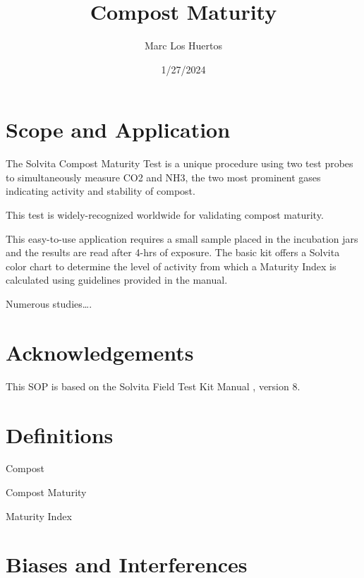 \documentclass[12pt]{../SOP4_alpha}\usepackage[]{graphicx}\usepackage[]{xcolor}
\title{Compost Maturity}
\date{1/27/2024}
\author{Marc Los Huertos}
\begin{document}

\maketitle

\section{Scope and Application}

\NP The Solvita Compost Maturity Test is a unique procedure using two test probes to simultaneously measure CO2 and NH3, the two most prominent gases indicating activity and stability of compost.

\NP This test is widely-recognized worldwide for validating compost maturity.

\NP This easy-to-use application requires a small sample placed in the incubation jars and the results are read after 4-hrs of exposure.  The basic kit offers a Solvita color chart to determine the level of activity from which a Maturity Index is calculated using guidelines provided in the manual.

\NP 

\NP Numerous studies\ldots \citep{vargas2005assessing}.

\section{Acknowledgements}

\NP This SOP is based on the Solvita Field Test Kit Manual \citep{solvita2014}, version 8.

\section{Definitions}

\begin{description*}

\item[Compost]

\item[Compost Maturity]

\item[Maturity Index]

\end{description*}

\section{Biases and Interferences}
\end{document}

